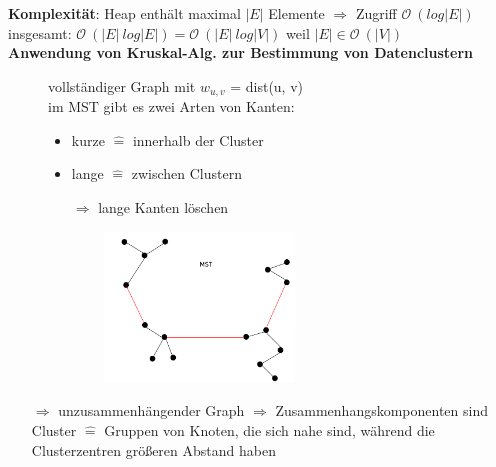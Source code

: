 \documentclass[11pt, fleqn]{scrreprt}
\begin{document}
	\textbf{Komplexität}: Heap enthält maximal $|E|$ Elemente $\Rightarrow$ Zugriff $\mathcal{O}\ (log|E|)$\\
	insgesamt: $\mathcal{O}\ (|E|\ log|E|) = \mathcal{O}\ (|E| \ log |V|)$ weil $|E| \in \mathcal{O}\ (|V|)$\\
	
	\textbf{Anwendung von Kruskal-Alg. zur Bestimmung von Datenclustern}\\
	\begin{figure}[htbp]
		\begin{minipage}{8cm}
			\vspace*{0mm}
			vollständiger Graph mit $w_{u,v}$ = dist(u, v)\\
			
			im MST gibt es zwei Arten von Kanten:
			\begin{itemize}
				\item kurze $\widehat{=}$ innerhalb der Cluster
				\item lange $\widehat{=}$ zwischen Clustern
				\item[$\Rightarrow$] lange Kanten löschen
			\end{itemize}
		\end{minipage}
		\begin{minipage}{8cm}
			\includegraphics[width=8cm,height=4cm,keepaspectratio]{./Pictures/Sternbild.png}
		\end{minipage}
	\end{figure}
	\begin{itemize}
		\item[$\Rightarrow$] unzusammenhängender Graph $\Rightarrow$ Zusammenhangskomponenten sind Cluster $\widehat{=}$ Gruppen von Knoten, die sich nahe sind, während die Clusterzentren größeren Abstand haben
	\end{itemize}
	
\end{document}
